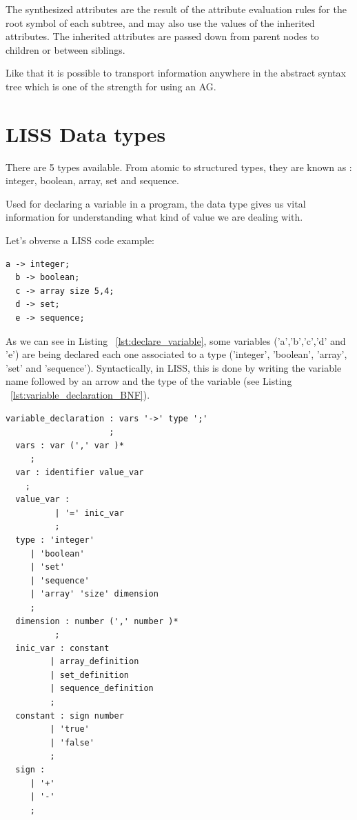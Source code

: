 \documentclass[
  oneside,
  11pt, a4paper,
  footinclude=true,
  headinclude=true,
  cleardoublepage=empty
]{scrbook}
\begin{document}
The synthesized attributes are the result of the attribute evaluation rules for the root symbol of each subtree, and may also use the values of the inherited attributes. The inherited attributes are passed down from parent nodes to children or between siblings.

Like that it is possible to transport information anywhere in the abstract syntax tree which is one of the strength for using an AG.


\section{LISS Data types}
\label{sec:data_types}

There are 5 types available.
From atomic to structured types, they are known as : integer, boolean, array, set and sequence.

Used for declaring a variable in a program, the data type gives us vital information for understanding what kind of value we are dealing with.

Let's obverse a LISS code example:

\begin{lstlisting}[caption={Declaring a variable in LISS},label={lst:declare_variable}]
  a -> integer;
  b -> boolean;
  c -> array size 5,4;
  d -> set;
  e -> sequence;
\end{lstlisting}

As we can see in Listing ~\ref{lst:declare_variable}, some variables ('a','b','c','d' and 'e')  are being declared each one associated to a type ('integer', 'boolean', 'array', 'set' and 'sequence').
Syntactically, in LISS, this is done by writing the variable name followed by an arrow and the type of the variable (see Listing ~\ref{lst:variable_declaration_BNF}).

\begin{lstlisting}[caption={CFG for declaring a variable in LISS},label={lst:variable_declaration_BNF}]
  variable_declaration : vars '->' type ';'
                     ;
  vars : var (',' var )*
     ;
  var : identifier value_var
    ;
  value_var :
          | '=' inic_var
          ;
  type : 'integer'
     | 'boolean'
     | 'set'
     | 'sequence'
     | 'array' 'size' dimension
     ;
  dimension : number (',' number )*
          ;
  inic_var : constant
         | array_definition
         | set_definition
         | sequence_definition
         ;
  constant : sign number
         | 'true'
         | 'false'
         ;
  sign :
     | '+'
     | '-'
     ;

\end{lstlisting}
\end{document}
